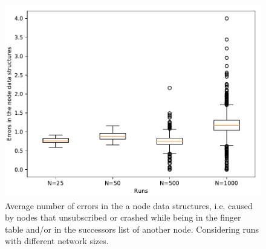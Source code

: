 \documentclass[11pt,twocolumn,letterpaper]{article}
\begin{document}
	\begin{figure}[!ht]
		\centering
		\includegraphics[width=\linewidth,clip,trim=0 0.5cm 0 0.35cm]{figures/analysis2/errors_box.pdf}
		\caption{Average number of errors in the a node data structures, i.e. caused by nodes that unsubscribed or crashed while being in the finger table and/or in the successors list of another node. Considering runs with different network sizes.}
		\label{fig:netsize2}
	\end{figure}	
		
\end{document}
